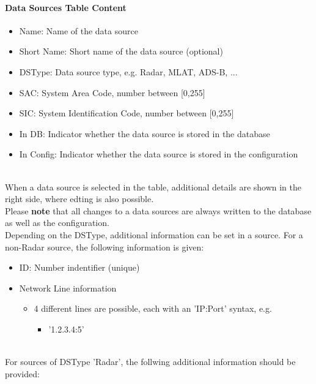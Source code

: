 \paragraph {Data Sources Table Content}
\label{sec:configure_datasources_table_content}

\begin{itemize}
\item Name: Name of the data source
\item Short Name: Short name of the data source (optional)
\item DSType: Data source type, e.g. Radar, MLAT, ADS-B, ...
\item SAC: System Area Code, number between [0,255]
\item SIC: System Identification Code, number between [0,255]
\item In DB: Indicator whether the data source is stored in the database
\item In Config: Indicator whether the data source is stored in the configuration
\end{itemize}
\ \\

When a data source is selected in the table, additional details are shown in the right side, where edting is also possible. \\

Please \textbf{note} that all changes to a data sources are always written to the database as well as the configuration. \\

Depending on the DSType, additional information can be set in a source. For a non-Radar source, the following information is given:

\begin{itemize}
\item ID: Number indentifier (unique)
\item Network Line information
\begin{itemize}
    \item 4 different lines are possible, each with an 'IP:Port' syntax, e.g.
    \begin{itemize}
    \item '1.2.3.4:5'
\end{itemize}
\end{itemize}
\end{itemize}
\ \\

For sources of DSType 'Radar', the follwing additional information should be provided:


